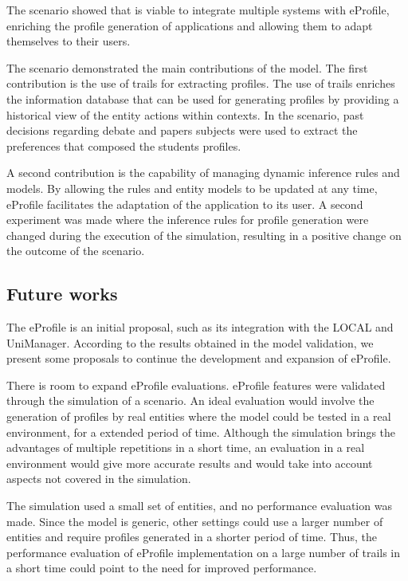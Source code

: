 \documentclass[preprint,authoryear,12pt,dvipdfm]{elsarticle}
\begin{document}
The scenario showed that is viable to integrate multiple systems with eProfile, enriching the profile generation of applications and allowing them to adapt themselves to their users. 

The scenario demonstrated the main contributions of the model. The first contribution is the use of trails for extracting profiles. The use of trails enriches the information database that can be used for generating profiles by providing a historical view of the entity actions within contexts. In the scenario, past decisions regarding debate and papers subjects were used to extract the preferences that composed the students profiles.

A second contribution is the capability of managing dynamic inference rules and models. By allowing the rules and entity models to be updated at any time, eProfile facilitates the adaptation of the application to its user. A second experiment was made where the inference rules for profile generation were changed during the execution of the simulation, resulting in a positive change on the outcome of the scenario.

\subsection{Future works}

The eProfile is an initial proposal, such as its integration with the LOCAL and UniManager. According to the results obtained in the model validation, we present some proposals to continue the development and expansion of eProfile.

There is room to expand eProfile evaluations. eProfile features were validated through the simulation of a scenario. An ideal evaluation would involve the generation of profiles by real entities where the model could be tested in a real environment, for a extended period of time. Although the simulation brings the advantages of multiple repetitions in a short time, an evaluation in a real environment would give more accurate results and would take into account aspects not covered in the simulation.

The simulation used a small set of entities, and no performance evaluation was made. Since the model is generic, other settings could use a larger number of entities and require profiles generated in a shorter period of time. Thus, the performance evaluation of eProfile implementation on a large number of trails in a short time could point to the need for improved performance.
\end{document}
